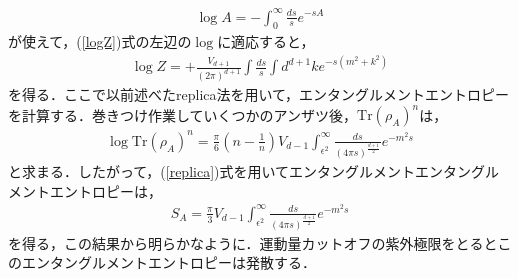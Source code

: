 \begin{align}
  \log A=-\int^{\infty}_{0}\frac{ds}{s}e^{-sA}
\end{align}が使えて，(\ref{logZ})式の左辺の$\log$に適応すると，
\begin{align}
  \log Z=+\frac{V_{d+1}}{(2\pi)^{d+1}}\int \frac{ds}{s}\int d^{d+1}k e^{-s(m^2+k^2)}
\end{align}
を得る．ここで以前述べたreplica法を用いて，エンタングルメントエントロピーを計算する．巻きつけ作業していくつかのアンザツ後，$\mathrm{Tr}(\rho_A)^n$は，
\begin{align}
  \log\mathrm{Tr}(\rho_{A})^{n}=\frac{\pi}{6}(n-\frac{1}{n})V_{d-1}\int^{\infty}_{\epsilon^2}\frac{ds}{(4\pi s)^{\frac{d+1}{2}}}e^{-m^2s}
\end{align}
と求まる．したがって，(\ref{replica})式を用いてエンタングルメントエンタングルメントエントロピーは，
\begin{align}
  S_A=\frac{\pi}{3}V_{d-1}\int^{\infty}_{\epsilon^2}\frac{ds}{(4\pi s)^{\frac{d+1}{2}}}e^{-m^2s}
\end{align}
を得る，この結果から明らかなように．運動量カットオフの紫外極限をとるとこのエンタングルメントエントロピーは発散する．
